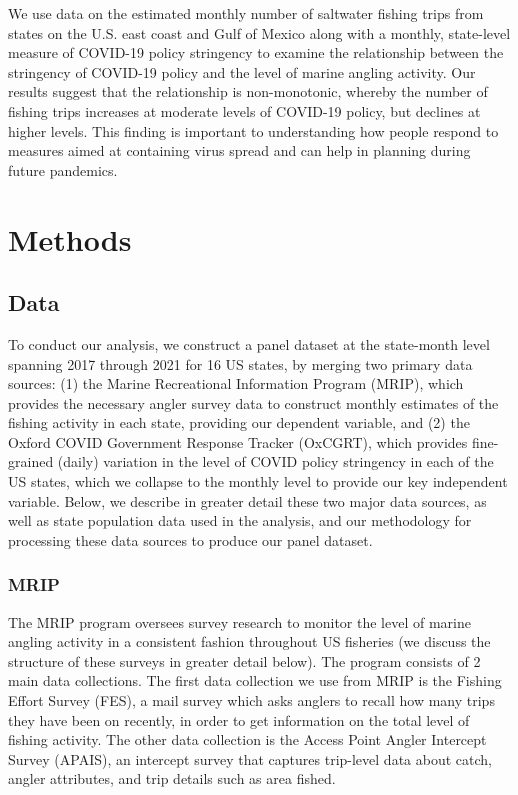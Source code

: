 \documentclass[12pt]{article}
\begin{document}
We use data on the estimated monthly number of saltwater fishing trips from states on the U.S. east coast and Gulf of Mexico along with a monthly, state-level measure of COVID-19 policy stringency to examine the relationship between the stringency of COVID-19 policy and the  level of marine angling activity. Our results suggest that the relationship is non-monotonic, whereby the number of fishing trips increases at moderate levels of COVID-19 policy, but declines at higher levels. This finding is important to understanding how people respond to measures aimed at containing virus spread and can help in planning during future pandemics.

\section{Methods}

\subsection{Data}

To conduct our analysis, we construct a panel dataset at the state-month
level spanning 2017 through 2021 for 16 US states, by merging two
primary data sources: (1) the Marine Recreational Information Program
(MRIP), which provides the necessary angler survey data to construct
monthly estimates of the fishing activity in each state, providing our
dependent variable, and (2) the Oxford COVID Government Response Tracker
(OxCGRT), which provides fine-grained (daily) variation in the level of
COVID policy stringency in each of the US states, which we collapse to
the monthly level to provide our key independent variable. Below, we
describe in greater detail these two major data sources, as well as
state population data used in the analysis, and our methodology for
processing these data sources to produce our panel dataset.

\subsubsection{MRIP}

The MRIP program oversees survey research to monitor the level of marine
angling activity in a consistent fashion throughout US fisheries (we
discuss the structure of these surveys in greater detail below). The
program consists of 2 main data collections. The first data collection
we use from MRIP is the Fishing Effort Survey (FES), a mail survey which
asks anglers to recall how many trips they have been on recently, in
order to get information on the total level of fishing activity. The
other data collection is the Access Point Angler Intercept Survey
(APAIS), an intercept survey that captures trip-level data about catch,
angler attributes, and trip details such as area fished.
\end{document}
